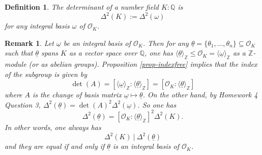 \documentclass[11pt]{book}
\newtheorem{definition}[theorem]{Definition}
\newtheorem{remark}[theorem]{Remark}
\begin{document}
\begin{definition} 
The determinant of a number field $K:\mathbb{Q}$ is 
$$\Delta^2(K) := \Delta^2(\omega)$$ for any integral basis $\omega$ of $\mathcal{O}_K$.
\end{definition}



\begin{remark} \label{rmk-intbasis}
    Let $\underline{\omega}$ be an integral basis of $\mathcal{O}_K$. Then for any $\underline{\theta} = \{\theta_1, \dots,\theta_n\} \subseteq \mathcal{O}_K$ such that $\underline{\theta}$ spans $K$ as a vector space over $\mathbb{Q}$, one has $\langle \underline{\theta} \rangle_{\mathbb{Z}} \leq \mathcal{O}_K = \langle \underline{\omega} \rangle_{\mathbb{Z}}$ as a $\mathbb{Z}$-module (or as abelian groups). Proposition \ref{prop-indexfree} implies that the index of the subgroup is given by
    $$\det(A) = [\langle \underline{\omega} \rangle_{\mathbb{Z}}: \langle \underline{\theta} \rangle_{\mathbb{Z}}] = [\mathcal{O}_K: \langle \underline{\theta} \rangle_{\mathbb{Z}}]$$
    where $A$ is the change of basis matrix $\underline{\omega} \mapsto \underline{\theta}$. On the other hand, by Homework 4 Question 3, 
    $\Delta^2(\underline{\theta}) = \det(A)^2 \Delta^2(\underline{\omega})$. So one has
    $$\Delta^2(\underline{\theta}) = [\mathcal{O}_K: \langle \underline{\theta} \rangle_{\mathbb{Z}}]^2 \Delta^2(K).$$
    In other words, one always has
    $$\Delta^2(K)\ |\ \Delta^2(\underline{\theta})$$
    and they are equal if and only if $\underline{\theta}$ is an integral basis of $\mathcal{O}_K$.
    \end{remark}
\end{document}

